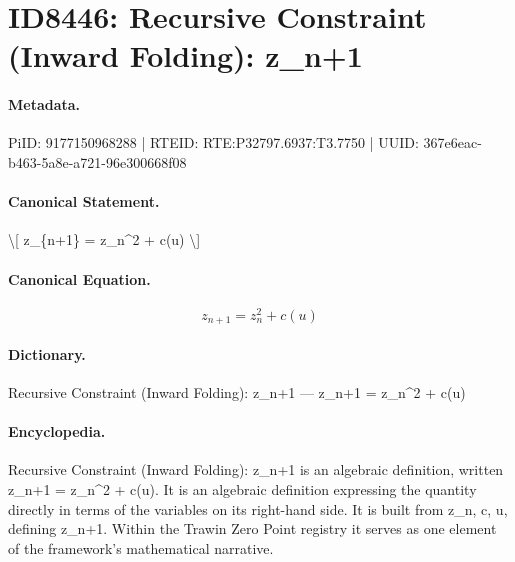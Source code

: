 \section*{ID8446: Recursive Constraint (Inward Folding): z\_n+1}
\paragraph{Metadata.}
PiID: 9177150968288 | RTEID: RTE:P32797.6937:T3.7750 | UUID: 367e6eac-b463-5a8e-a721-96e300668f08

\paragraph{Canonical Statement.}
\textbackslash{}[ z\_\{n+1\} = z\_n\textasciicircum{}2 + c(u) \textbackslash{}]

\paragraph{Canonical Equation.}
\[
z_{n+1} = z_n^2 + c(u)
\]

\paragraph{Dictionary.}
Recursive Constraint (Inward Folding): z\_n+1 — z\_n+1 = z\_n\textasciicircum{}2 + c(u)

\paragraph{Encyclopedia.}
Recursive Constraint (Inward Folding): z\_n+1 is an algebraic definition, written z\_n+1 = z\_n\textasciicircum{}2 + c(u). It is an algebraic definition expressing the quantity directly in terms of the variables on its right-hand side. It is built from z\_n, c, u, defining z\_n+1. Within the Trawin Zero Point registry it serves as one element of the framework's mathematical narrative.

